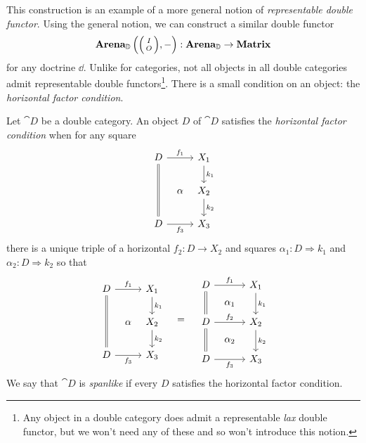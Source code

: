 \documentclass[DynamicalBook]{subfiles}
\begin{document}
This construction is an example of a more general notion of \emph{representable
  double functor}. Using the general notion, we can construct a similar double functor
$$\Cat{Arena}_{\dd}\left( \littlelens{I}{O}, - \right) : \Cat{Arena}_{\dd} \to
\Cat{Matrix}$$
for any doctrine $\dd$.
Unlike for categories, not all objects in all double
categories admit representable double functors\footnote{Any object in a double
  category does admit a representable \emph{lax} double functor, but we won't
  need any of these and so won't introduce this notion.}. There is a small
condition on an object: the \emph{horizontal factor condition}.
\begin{definition}\label{defn:spanlike}
  Let $\cat{D}$ be a double category. An object $D$ of $\cat{D}$ satisfies the
  \emph{horizontal factor condition} when for any square 
\[
        \begin{tikzcd}[column sep=tiny]
          D \ar[dd, equals] \ar[rr, "f_1"] & & X_1 \ar[d, "k_1"] \\
           & \alpha & X_2 \ar[d, "k_2"]\\
          D \ar[rr, "f_3"'] & & X_3
        \end{tikzcd}
        \]
  there is a unique triple of a horizontal $f_2 : D \to X_2$ and squares
  $\alpha_1 : D \Rightarrow k_1$ and $\alpha_2 : D \Rightarrow k_2$ so that
\[
        \begin{tikzcd}[column sep=tiny]
          D \ar[dd, equals] \ar[rr, "f_1"] & & X_1 \ar[d, "k_1"] \\
           & \alpha & X_2 \ar[d, "k_2"]\\
          D \ar[rr, "f_3"'] & & X_3
        \end{tikzcd}
        \quad=\quad
       \begin{tikzcd}[sep = tiny]
	D && {X_1} \\
	& {\alpha_1} \\
	D && {X_2} \\
	& {\alpha_2} \\
	D && {X_3}
	\arrow[from=1-1, to=3-1, equals]
	\arrow[from=3-1, to=5-1, equals]
	\arrow["{f_1}", from=1-1, to=1-3]
	\arrow["{f_2}", from=3-1, to=3-3]
	\arrow["{f_3}"', from=5-1, to=5-3]
	\arrow["{k_1}", from=1-3, to=3-3]
	\arrow["{k_2}", from=3-3, to=5-3]
\end{tikzcd} 
\]
 We say that $\cat{D}$ is \emph{spanlike} if every $D$ satisfies the horizontal
 factor condition. 
\end{definition}
\end{document}
